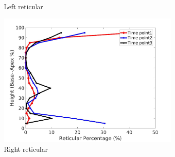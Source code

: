 \begin{figure}[H]
\begin{subfigure}{.42\linewidth}
  \caption{Left reticular}
  \label{fig:IPF21DiseaseAgainstHeightMain-c} 
\end{subfigure} 
\begin{subfigure}{.42\linewidth}%
  \includegraphics[width=\linewidth,trim={{.0\wd0} {.0\wd0} {.0\wd0} {.0\wd0}},clip]{QuantitativeAnalysis/Image/IPF21RightLungReticularDiseaseAgainstHeight.jpg}
  \caption{Right reticular}
  \label{fig:IPF21DiseaseAgainstHeightMain-d}
\end{subfigure}
\begin{subfigure}{.42\linewidth}%

\end{subfigure}
\end{figure}
